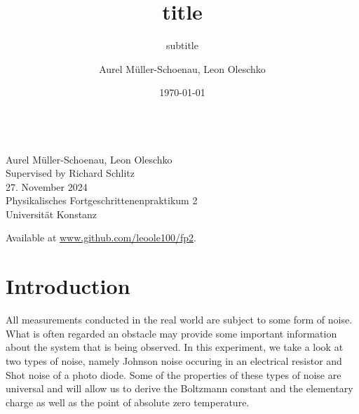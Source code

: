 \documentclass[
    parskip=half, 
    twoside=false,
    twocolumn=true,
    fontsize=11pt,
]{scrarticle}
\begin{document}
\title{title}
\subtitle{subtitle}
\author{Aurel Müller-Schoenau, Leon Oleschko}
\date{\dotdate\today}


\begin{titlepage}
    \sffamily
    \vspace*{3cm}
    {
        \fontsize{32}{32}
    }
    \vspace{.25cm}\\
    {
        \Large
        Aurel Müller-Schoenau, Leon Oleschko\\
        Supervised by Richard Schlitz
        \vspace{.05cm}\\
        27. November 2024
        \vspace{.25cm}\\
        \normalsize
        Physikalisches Fortgeschrittenenpraktikum 2\\
        Universität Konstanz
    }
    \vfill
    {
        \normalfont\normalsize
        
    }
    \vfill
    \begin{flushright}
        Available at \url{www.github.com/leoole100/fp2}.
    \end{flushright}
\end{titlepage}

\section{Introduction}

All measurements conducted in the real world are subject to some form of noise. What is often regarded an obstacle may provide some important information about the system that is being observed. In this experiment, we take a look at two types of noise, namely Johnson noise occuring in an electrical resistor and Shot noise of a photo diode. Some of the properties of these types of noise are universal and will allow us to derive the Boltzmann constant and the elementary charge as well as the point of absolute zero temperature.
\end{document}

